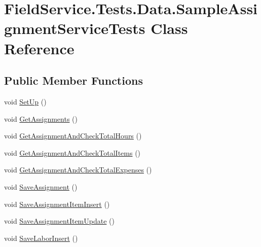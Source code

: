 \hypertarget{class_field_service_1_1_tests_1_1_data_1_1_sample_assignment_service_tests}{\section{Field\+Service.\+Tests.\+Data.\+Sample\+Assignment\+Service\+Tests Class Reference}
\label{class_field_service_1_1_tests_1_1_data_1_1_sample_assignment_service_tests}
}
\subsection*{Public Member Functions}
\begin{DoxyCompactItemize}
\item 
void \hyperlink{class_field_service_1_1_tests_1_1_data_1_1_sample_assignment_service_tests_a9243bd220540222a36bb044f179b3bab}{Set\+Up} ()
\item 
void \hyperlink{class_field_service_1_1_tests_1_1_data_1_1_sample_assignment_service_tests_aef3c2f0d5a93bedc0daedb55826f02af}{Get\+Assignments} ()
\item 
void \hyperlink{class_field_service_1_1_tests_1_1_data_1_1_sample_assignment_service_tests_a9a8c075563c0838228dbd3690deda12c}{Get\+Assignment\+And\+Check\+Total\+Hours} ()
\item 
void \hyperlink{class_field_service_1_1_tests_1_1_data_1_1_sample_assignment_service_tests_a9717d43f5336c4b98ef7e23e0229cc41}{Get\+Assignment\+And\+Check\+Total\+Items} ()
\item 
void \hyperlink{class_field_service_1_1_tests_1_1_data_1_1_sample_assignment_service_tests_ab5ee03da6202c843dd53316681f82767}{Get\+Assignment\+And\+Check\+Total\+Expenses} ()
\item 
void \hyperlink{class_field_service_1_1_tests_1_1_data_1_1_sample_assignment_service_tests_aa053103ca3acad7d735fdf6d34b68089}{Save\+Assignment} ()
\item 
void \hyperlink{class_field_service_1_1_tests_1_1_data_1_1_sample_assignment_service_tests_a641ce35ec154be1c3b71ec1cca42ce53}{Save\+Assignment\+Item\+Insert} ()
\item 
void \hyperlink{class_field_service_1_1_tests_1_1_data_1_1_sample_assignment_service_tests_a8e9901d2f42c31dc3e5988787170ee12}{Save\+Assignment\+Item\+Update} ()
\item 
void \hyperlink{class_field_service_1_1_tests_1_1_data_1_1_sample_assignment_service_tests_a7c34dc5f87735db6b1dc7edd421dd103}{Save\+Labor\+Insert} ()

\end{DoxyCompactItemize}
